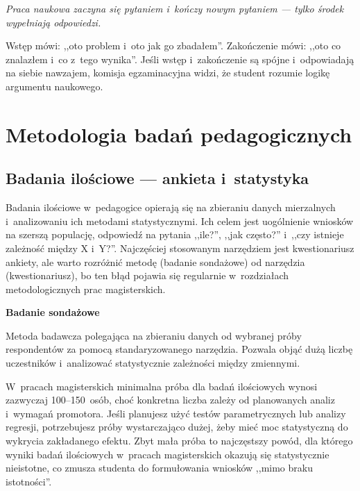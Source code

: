 \documentclass[11pt,a5paper,twoside,openany]{book}
\let\bforigsection\section
\renewcommand{\section}{\needspace{4\baselineskip}\bforigsection}
\newcommand{\pullquote}[1]{%
  \par\vspace{12pt}\noindent
  \begin{tcolorbox}[blanker, breakable, left=2.2em, right=1em, top=2pt, bottom=2pt,
    borderline west={2.5pt}{0pt}{accent}]
    {\color{chaptercolor}\Large\itshape #1}
  \end{tcolorbox}\vspace{10pt}\par
}
\newcommand{\concept}[2]{%
  \par\vspace{6pt}
  \begin{tcolorbox}[enhanced, breakable, colback=accent!6, colframe=accent,
    boxrule=0pt, leftrule=3.5pt, arc=2pt, drop fuzzy shadow={black!15},
    left=10pt, right=10pt, top=7pt, bottom=7pt, before upper={\parindent0pt}]
    {\sffamily\bfseries\color{accent}#1}\par\vspace{2pt}\small #2
  \end{tcolorbox}\par
}
\begin{document}
\pullquote{Praca naukowa zaczyna się pytaniem i~kończy nowym pytaniem --- tylko środek wypełniają odpowiedzi.}

\begin{keyinsight}
Wstęp mówi: ,,oto problem i~oto jak go zbadałem''. Zakończenie mówi: ,,oto co znalazłem i~co z~tego wynika''. Jeśli wstęp i~zakończenie są spójne i~odpowiadają na siebie nawzajem, komisja egzaminacyjna widzi, że student rozumie logikę argumentu naukowego.
\end{keyinsight}

\clearpage

\chapter{Metodologia badań pedagogicznych}

\section{Badania ilościowe --- ankieta i~statystyka}

Badania ilościowe w~pedagogice opierają się na zbieraniu danych mierzalnych i~analizowaniu ich metodami statystycznymi. Ich celem jest uogólnienie wniosków na szerszą populację, odpowiedź na pytania ,,ile?'', ,,jak często?'' i~,,czy istnieje zależność między X i~Y?''. Najczęściej stosowanym narzędziem jest kwestionariusz ankiety, ale warto rozróżnić metodę (badanie sondażowe) od narzędzia (kwestionariusz), bo ten błąd pojawia się regularnie w~rozdziałach metodologicznych prac magisterskich.

\concept{Badanie sondażowe}{Metoda badawcza polegająca na zbieraniu danych od wybranej próby respondentów za pomocą standaryzowanego narzędzia. Pozwala objąć dużą liczbę uczestników i~analizować statystycznie zależności między zmiennymi.}

W~pracach magisterskich minimalna próba dla badań ilościowych wynosi zazwyczaj 100--150~osób, choć konkretna liczba zależy od planowanych analiz i~wymagań promotora. Jeśli planujesz użyć testów parametrycznych lub analizy regresji, potrzebujesz próby wystarczająco dużej, żeby mieć moc statystyczną do wykrycia zakładanego efektu. Zbyt mała próba to najczęstszy powód, dla którego wyniki badań ilościowych w~pracach magisterskich okazują się statystycznie nieistotne, co zmusza studenta do formułowania wniosków ,,mimo braku istotności''.
\end{document}
